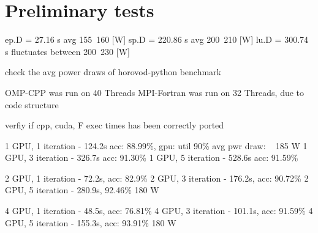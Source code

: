 \section{Preliminary tests}











ep.D = 27.16 s          avg 155~160 [W]
sp.D = 220.86 s         avg 200~210 [W]
lu.D = 300.74 s         fluctuates between 200~230 [W]


check the avg power draws of horovod-python benchmark

OMP-CPP was run on 40 Threads
MPI-Fortran was run on 32 Threads, due to code structure

verfiy if cpp, cuda, F exec times has been correctly ported


1 GPU, 1 iteration - 124.2s acc: 88.99\%, gpu: util 90\% avg pwr draw: ~ 185 W
1 GPU, 3 iteration - 326.7s acc: 91.30\%
1 GPU, 5 iteration - 528.6s acc: 91.59\%

2 GPU, 1 iteration - 72.2s, acc: 82.9\%
2 GPU, 3 iteration - 176.2s, acc: 90.72\%
2 GPU, 5 iteration - 280.9s, 92.46\%     180 W

4 GPU, 1 iteration - 48.5s, acc: 76.81\%
4 GPU, 3 iteration - 101.1s, acc: 91.59\%
4 GPU, 5 iteration - 155.3s, acc: 93.91\% 180 W


